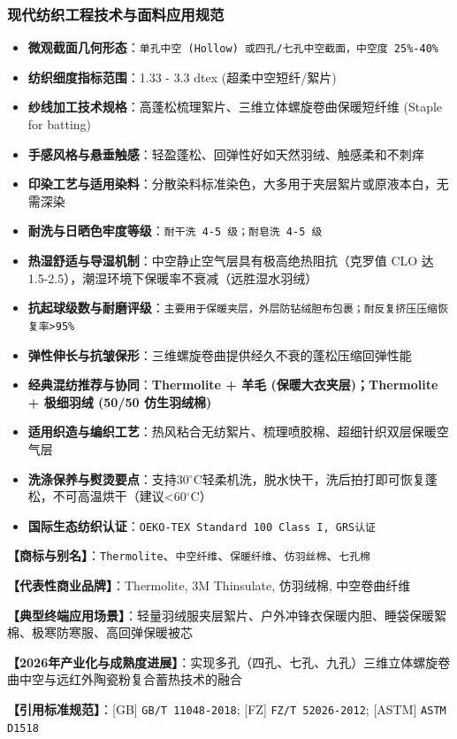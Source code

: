 \documentclass[11pt,openright,twoside,UTF8]{ctexbook}
\begin{document}
\subsubsection*{现代纺织工程技术与面料应用规范}
\begin{itemize} \setlength{\itemsep}{2pt}
    \item \textbf{微观截面几何形态}：\texttt{单孔中空 (Hollow) 或四孔/七孔中空截面，中空度 25\%-40\%}
    \item \textbf{纺织细度指标范围}：1.33 - 3.3 dtex (超柔中空短纤/絮片)
    \item \textbf{纱线加工技术规格}：高蓬松梳理絮片、三维立体螺旋卷曲保暖短纤维 (Staple for batting)
    \item \textbf{手感风格与悬垂触感}：轻盈蓬松、回弹性好如天然羽绒、触感柔和不刺痒
    \item \textbf{印染工艺与适用染料}：分散染料标准染色，大多用于夹层絮片或原液本白，无需深染
    \item \textbf{耐洗与日晒色牢度等级}：\texttt{耐干洗 4-5 级；耐皂洗 4-5 级}
    \item \textbf{热湿舒适与导湿机制}：中空静止空气层具有极高绝热阻抗（克罗值 CLO 达 1.5-2.5），潮湿环境下保暖率不衰减（远胜湿水羽绒）
    \item \textbf{抗起球级数与耐磨评级}：\texttt{主要用于保暖夹层，外层防钻绒胆布包裹；耐反复挤压压缩恢复率\textgreater{}95\%}
    \item \textbf{弹性伸长与抗皱保形}：三维螺旋卷曲提供经久不衰的蓬松压缩回弹性能
    \item \textbf{经典混纺推荐与协同}：\textbf{Thermolite + 羊毛 (保暖大衣夹层)；Thermolite + 极细羽绒 (50/50 仿生羽绒棉)}
    \item \textbf{适用织造与编织工艺}：热风粘合无纺絮片、梳理喷胶棉、超细针织双层保暖空气层
    \item \textbf{洗涤保养与熨烫要点}：支持30$^\circ\mathrm{C}$轻柔机洗，脱水快干，洗后拍打即可恢复蓬松，不可高温烘干（建议\textless{}60$^\circ\mathrm{C}$）
    \item \textbf{国际生态纺织认证}：\texttt{OEKO-TEX Standard 100 Class I, GRS认证}
\end{itemize}
\vspace{0.2cm}

\noindent\textbf{【商标与别名】}：\texttt{Thermolite}、\texttt{中空纤维}、\texttt{保暖纤维}、\texttt{仿羽丝棉}、\texttt{七孔棉}\par
\noindent\textbf{【代表性商业品牌】}：Thermolite, 3M Thinsulate, 仿羽绒棉, 中空卷曲纤维\par
\noindent\textbf{【典型终端应用场景】}：轻量羽绒服夹层絮片、户外冲锋衣保暖内胆、睡袋保暖絮棉、极寒防寒服、高回弹保暖被芯\par
\noindent\textbf{【2026年产业化与成熟度进展】}：实现多孔（四孔、七孔、九孔）三维立体螺旋卷曲中空与远红外陶瓷粉复合蓄热技术的融合\par
\noindent\textbf{【引用标准规范】}：[GB] \texttt{GB/T 11048-2018}; [FZ] \texttt{FZ/T 52026-2012}; [ASTM] \texttt{ASTM D1518}\par
\vspace{0.5cm}
\end{document}
